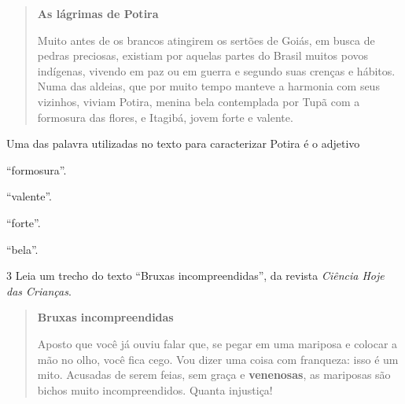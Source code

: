 \begin{quote}
\textbf{As lágrimas de Potira}

Muito antes de os brancos atingirem os sertões de Goiás, em busca de
pedras preciosas, existiam por aquelas partes do Brasil muitos povos
indígenas, vivendo em paz ou em guerra e segundo suas crenças e hábitos.
Numa das aldeias, que por muito tempo manteve a harmonia com seus
vizinhos, viviam Potira, menina bela contemplada por Tupã com a formosura das
flores, e Itagibá, jovem forte e valente. 
\end{quote}


Uma das palavra utilizadas no texto para caracterizar Potira é o adjetivo

\begin{escolha}
\item ``formosura''.

\item ``valente''.

\item ``forte''.

\item ``bela''.
\end{escolha}


\num{3} Leia um trecho do texto ``Bruxas incompreendidas'',
da revista \textit{Ciência Hoje das Crianças}.

\begin{quote}
\textbf{Bruxas incompreendidas}

Aposto que você já ouviu falar que, se pegar em uma mariposa e colocar a
mão no olho, você fica cego. Vou dizer uma coisa com franqueza: isso é
um mito. Acusadas de serem feias, sem graça e \textbf{venenosas}, as
mariposas são bichos muito incompreendidos. Quanta injustiça!
\end{quote}


